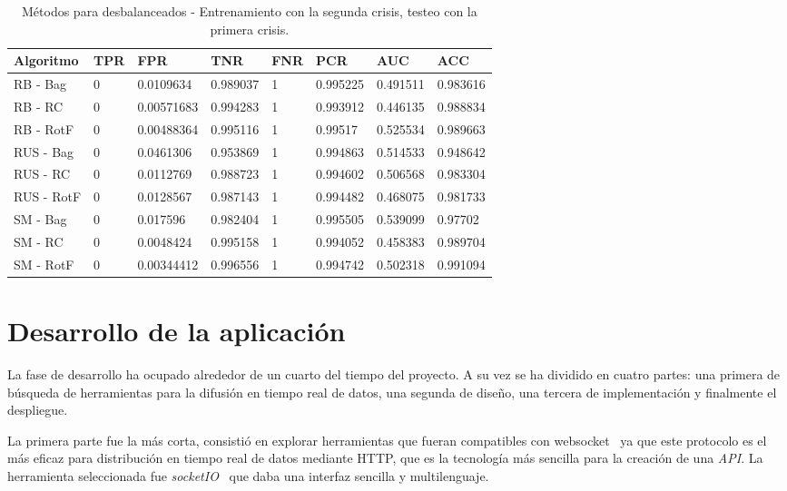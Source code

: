 \begin{table}\scriptsize
	\begin{center}
		\begin{tabular}{llllllll}
			\toprule
			Algoritmo & TPR &         FPR &       TNR & FNR &       PCR &       AUC &       ACC \\
			\midrule
			RB - Bag                &   0 &   0.0109634 &  0.989037 &   1 &  0.995225 &  0.491511 &  0.983616 \\
			RB - RC       &   0 &  0.00571683 &  0.994283 &   1 &  0.993912 &  0.446135 &  0.988834 \\
			RB - RotF        &   0 &  0.00488364 &  0.995116 &   1 &   0.99517 &  0.525534 &  0.989663 \\
			RUS - Bag          &   0 &   0.0461306 &  0.953869 &   1 &  0.994863 &  0.514533 &  0.948642 \\
			RUS - RC &   0 &   0.0112769 &  0.988723 &   1 &  0.994602 &  0.506568 &  0.983304 \\
			RUS - RotF  &   0 &   0.0128567 &  0.987143 &   1 &  0.994482 &  0.468075 &  0.981733 \\
			SM - Bag                         &   0 &    0.017596 &  0.982404 &   1 &  0.995505 &  0.539099 &   0.97702 \\
			SM - RC                &   0 &   0.0048424 &  0.995158 &   1 &  0.994052 &  0.458383 &  0.989704 \\
			SM - RotF                 &   0 &  0.00344412 &  0.996556 &   1 &  0.994742 &  0.502318 &  0.991094 \\
			\bottomrule
		\end{tabular}
		\caption{Métodos para desbalanceados - Entrenamiento con la segunda crisis, testeo con la primera crisis.}
		\label{tab:crisis2}
	\end{center}
\end{table}

\section{Desarrollo de la aplicación}
La fase de desarrollo ha ocupado alrededor de un cuarto del tiempo del proyecto. A su vez se ha dividido en cuatro partes: una primera de búsqueda de herramientas para la difusión en tiempo real de datos, una segunda de diseño, una tercera de implementación y finalmente el despliegue.

La primera parte fue la más corta, consistió en explorar herramientas que fueran compatibles con websocket~\cite{wiki:websocket} ya que este protocolo es el más eficaz para distribución en tiempo real de datos mediante HTTP, que es la tecnología más sencilla para la creación de una \textit{API}. La herramienta seleccionada fue \textit{socketIO}~\cite{tool:socketio} que daba una interfaz sencilla y multilenguaje.

